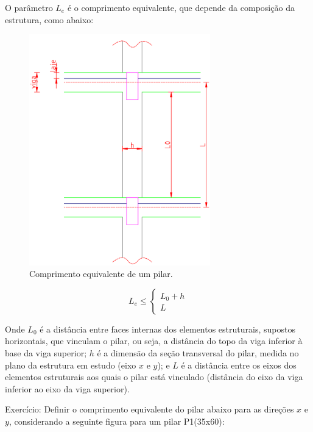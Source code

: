 O parâmetro $L_e$ é o comprimento equivalente, que depende da composição da estrutura, como abaixo:

\begin{figure}[H]
	\begin{center}
	\caption{Comprimento equivalente de um pilar.}
    	\includegraphics[width=0.7\textwidth]{Comprimento-equivalente/Imagens/Comprimento-equivalente.png}
	\end{center}
\end{figure}

\begin{equation}
	\label{equacao-comprimento-equivalente}
	L_e\leqslant\left\{
		\begin{array}{ll}
		L_0+h \\
		L
		\end{array}\right.
\end{equation}

Onde $L_0$ é a distância entre faces internas dos elementos estruturais, supostos horizontais, que vinculam o pilar, ou seja, a distância do topo da viga inferior à base da viga superior; $h$ é a dimensão da seção transversal do pilar, medida no plano da estrutura em estudo (eixo $x$ e $y$); e $L$ é a distância entre os eixos dos elementos estruturais aos quais o pilar está vinculado (distância do eixo da viga inferior ao eixo da viga superior).

Exercício: Definir o comprimento equivalente do pilar abaixo para as direções $x$ e $y$, considerando a seguinte figura para um pilar P1(35x60):

